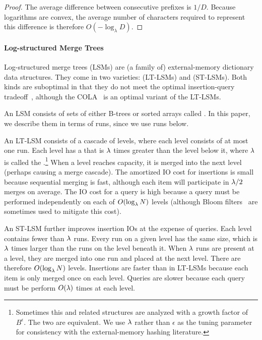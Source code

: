 \begin{proof}
	The average difference between consecutive prefixes is $1/D$. Because
	logarithms are convex, the average number of characters required to
	represent this difference is therefore $O(-\log_\lambda{D})$.
\end{proof}

\paragraph{Log-structured Merge Trees}\label{sec:lsm}
Log-structured merge trees (LSMs) are (a family of) external-memory dictionary
data structures.  They come in two varieties: 
(LT-LSMs) and  (ST-LSMs).  Both kinds are suboptimal in
that they do not meet the optimal insertion-query
tradeoff~\cite{DBLP:conf/soda/BrodalF03}, although the
COLA~\cite{DBLP:conf/spaa/BenderFFFKN07} is an optimal variant of the LT-LSMs.

An LSM consists of sets of either B-trees or sorted arrays called .
In this paper, we describe them in terms of runs, since we use runs below.

An LT-LSM consists of a cascade of levels, where each level consists
of at most one run.  Each level has a  that is $\lambda$
times greater than the level below it, where $\lambda$ is called the
.\footnote{Sometimes this and related structures
  are analyzed with a growth factor of $B^\epsilon$. The two are
  equivalent. We use $\lambda$ rather than $\epsilon$ as the tuning
  parameter for consistency with the external-memory hashing
  literature.}  When a level reaches capacity, it is merged into the
next level (perhaps causing a merge cascade).  The amortized IO cost
for insertions is small because sequential merging is fast, although
each item will participate in $\lambda/2$ merges on average.  The IO
cost for a query is high because a query must be performed independently
on each of $O(\log_\lambda N)$ levels (although Bloom
filters~\cite{DBLP:journals/cacm/Bloom70,DBLP:journals/pvldb/BenderFJKKMMSSZ12}
are sometimes used to mitigate this cost).

An ST-LSM further improves insertion IOs at the expense of queries.
Each level contains fewer than $\lambda$ runs.  Every run on a given
level has the same size, which is $\lambda$ times larger than the runs
on the level beneath it.  When $\lambda$ runs are present at a level,
they are merged into one run and placed at the next level.  There are
therefore $O(\log_{\lambda} N)$ levels.  Insertions are faster than in
LT-LSMs because each item is only merged once on each level.  Queries
are slower because each query must be perform $O(\lambda)$ times at each
level.


